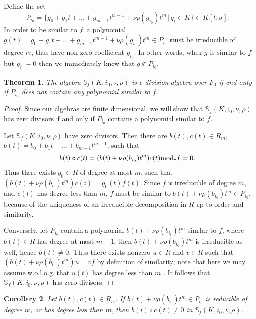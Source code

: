 \documentclass[12pt]{amsart}
\theoremstyle{plain}
\newtheorem{theorem}{Theorem}[section]
\newtheorem{corollary}[theorem]{Corollary}
\theoremstyle{definition}
\numberwithin{equation}{section}
\numberwithin{figure}{section}
\begin{document}
Define the set
$$ P_{i_0} =\lbrace g_0+g_1t+\dots+g_{m-1}t^{m-1}+\nu\rho(g_{i_0})t^m\,|\, g_i\in K\rbrace \subset K[t;\sigma].$$
In order to be similar to $f$, a polynomial $g(t)=g_0+g_1t+\dots+g_{m-1}t^{m-1}+\nu\rho(g_{i_0})t^m\in  P_{i_0} $ must be irreducible of degree $m$, thus have non-zero coefficient $g_{i_0}$.
In other words, when $g$ is similar to $f$ but $g_{i_0}=0$ then we immediately know that $g\not \in P_{i_0}$.

\begin{theorem}  \label{thm:division}
 The algebra
$\mathbb{S}_f(K,i_0,\nu,\rho)$  is a division algebra over $F_0$ if and only if  $ P_{i_0} $ does not contain any polynomial similar to $f$.
\end{theorem}

\begin{proof}
Since our algebras are finite dimensional, we will show that $\mathbb{S}_f(K,i_0,\nu,\rho)$ has zero divisors if and only if  $ P_{i_0} $ contains a polynomial similar to $f$.

 Let  $\mathbb{S}_f(K,i_0,\nu,\rho)$ have zero divisors. Then
there are $b(t), c(t)\in R_m$, $b(t)=b_0+b_1t+\dots+b_{m-1}t^{m-1}$, such that
$$b(t)\circ c(t)=(b(t)+\nu \rho (b_{i_0})t^m) c(t){\rm mod}_r f =0.$$
 Thus
 there exists $g_0\in R$ of degree at most $m$, such that $(b(t)+\nu \rho (b_{i_0})t^m) c(t)=g_0(t)f(t).$
Since $f$ is irreducible of degree $m$, and $c(t)$ has degree less than $m$, $f$ must be similar to $b(t)+\nu \rho (b_{i_0})t^m \in P_{i_0}$, because of the uniqueness of an irreducible decomposition in $R$ up to order and similarity.

Conversely, let $ P_{i_0} $ contain a polynomial $b(t)+\nu \rho (b_{i_0})t^m$ similar to $f$, where $b(t)\in R$ has degree at most $m-1$, then $b(t)+\nu \rho (b_{i_0})t^m$ is irreducible as well, hence $b(t)\not=0$. Thus there exists nonzero $u\in R$  and $v\in R$ such that $(b(t)+\nu \rho (b_{i_0})t^m)u=vf$ by definition of similarity;
note that here we may assume w.o.l.o.g. that $u(t)$ has degree less than $m$ \cite[p.~14]{J96}.
It follows that $\mathbb{S}_f(K,i_0,\nu,\rho)$ has zero divisors.
\end{proof}



\begin{corollary}  \label{cor:division2}
 Let  $b(t), c(t)\in R_m$. If $b(t)+\nu \rho (b_{i_0})t^m \in  P_{i_0} $ is reducible of degree $m$,
or has degree less than $m$, then $b(t)\circ c(t)\not=0$  in $\mathbb{S}_f(K,i_0,\nu,\rho)$.
\end{corollary}
\end{document}
